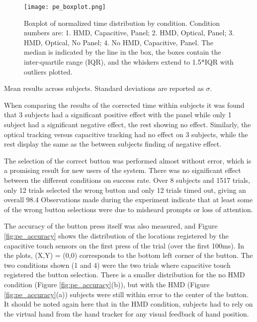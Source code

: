 \begin{figure}
    \centering
    \texttt{[image: pe\_boxplot.png]}
    \caption{Boxplot of normalized time distribution by condition. Condition numbers are: 1. HMD, Capacitive, Panel; 2. HMD, Optical, Panel; 3. HMD, Optical, No Panel; 4. No HMD, Capacitive, Panel. The median is indicated by the line in the box, the boxes contain the inter-quartile range (IQR), and the whiskers extend to 1.5*IQR with outliers plotted.}
    \label{fig:pe_boxplot}
\end{figure}

\begin{table}
    \centering
    \caption{Mean results across subjects. Standard deviations are reported as $\sigma$.}
    \label{tab:pe_results}
\end{table}

When comparing the results of the corrected time within subjects it was found that 3 subjects had a significant positive effect with the panel while only 1 subject had a significant negative effect, the rest showing no effect.
Similarly, the optical tracking versus capacitive tracking had no effect on 3 subjects, while the rest display the same as the between subjects finding of negative effect.

The selection of the correct button was performed almost without error, which is a promising result for new users of the system.
There was no significant effect between the different conditions on success rate.
Over 8 subjects and 1517 trials, only 12 trials selected the wrong button and only 12 trials timed out, giving an overall 98.4%
Observations made during the experiment indicate that at least some of the wrong button selections were due to misheard prompts or loss of attention.

The accuracy of the button press itself was also measured, and Figure \ref{fig:pe_accuracy} shows the distribution of the locations registered by the capacitive touch sensors on the first press of the trial (over the first 100ms).
In the plots, (X,Y) = (0,0) corresponds to the bottom left corner of the button.
The two conditions shown (1 and 4) were the two trials where capacitive touch registered the button selection.
There is a smaller distribution for the no HMD condition (Figure \ref{fig:pe_accuracy}(b)), but with the HMD (Figure \ref{fig:pe_accuracy}(a)) subjects were still within error to the center of the button.
It should be noted again here that in the HMD condition, subjects had to rely on the virtual hand from the hand tracker for any visual feedback of hand position.


